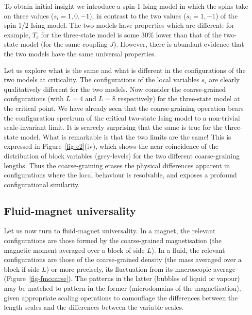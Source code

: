 \documentclass[
  letterpaper,
  enabledeprecatedfontcommands]{report}
\begin{document}
To obtain initial insight we introduce a spin-1 Ising model in which the
spins take on three values (\(s_i=1,0,-1\)), in contrast to the two
values (\(s_i=1,-1\)) of the spin-1/2 Ising model. The two models have
properties which are different: for example, \(T_c\) for the three-state
model is some \(30\%\) lower than that of the two-state model (for the
same coupling \(J\)). However, there is abundant evidence that the two
models have the same universal properties.

Let us explore what is the same and what is different in the
configurations of the two models at criticality. The configurations of
the local variables \(s_i\) are clearly qualitatively different for the
two models. Now consider the coarse-grained configurations (with \(L=4\)
and \(L=8\) respectively) for the three-state model at the critical
point. We have already seen that the coarse-graining operation bears the
configuration spectrum of the critical two-state Ising model to a
non-trivial scale-invariant limit. It is scarcely surprising that the
same is true for the three-state model. What is remarkable is that the
two limits are the same! This is expressed in Figure~\ref{fig-c2}(iv),
which shows the near coincidence of the distribution of block variables
(grey-levels) for the two different coarse-graining lengths. Thus the
coarse-graining erases the physical differences apparent in
configurations where the local behaviour is resolvable, and exposes a
profound configurational similarity.

\subsection{Fluid-magnet universality}\label{fluid-magnet-universality}

Let us now turn to fluid-magnet universality. In a magnet, the relevant
configurations are those formed by the coarse-grained magnetisation (the
magnetic moment averaged over a block of side \(L\)). In a fluid, the
relevant configurations are those of the coarse-grained density (the
mass averaged over a block if side \(L\)) or more precisely, its
fluctuation from its macroscopic average (Figure~\ref{fig-fmcoarse}).
The patterns in the latter (bubbles of liquid or vapour) may be matched
to pattern in the former (microdomains of the magnetisation), given
appropriate scaling operations to camouflage the differences between the
length scales and the differences between the variable scales.
\end{document}
